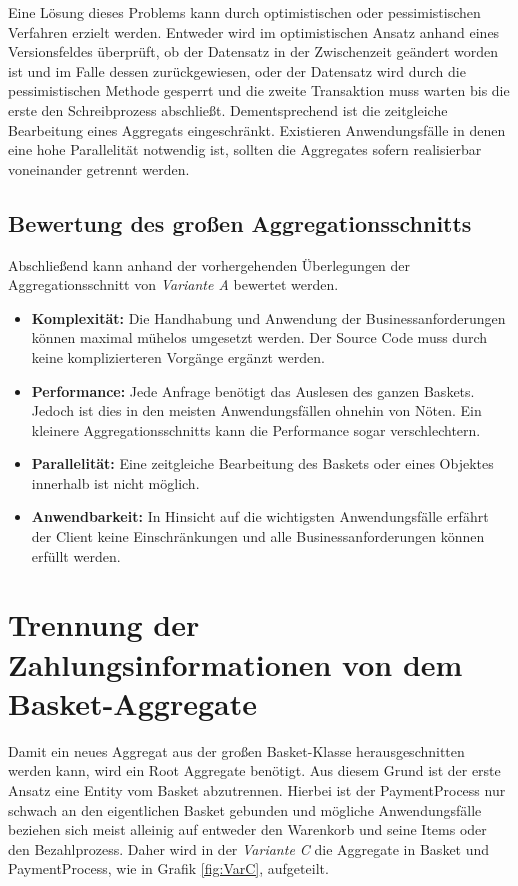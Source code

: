 Eine Lösung dieses Problems kann durch optimistischen oder pessimistischen Verfahren erzielt werden. Entweder wird im optimistischen Ansatz anhand eines Versionsfeldes überprüft, ob der Datensatz in der Zwischenzeit geändert worden ist und im Falle dessen zurückgewiesen, oder der Datensatz wird durch die pessimistischen Methode gesperrt und die zweite Transaktion muss warten bis die erste den Schreibprozess abschließt. Dementsprechend ist die zeitgleiche Bearbeitung eines Aggregats eingeschränkt. Existieren Anwendungsfälle in denen eine hohe Parallelität notwendig ist, sollten die Aggregates sofern realisierbar voneinander getrennt werden. 

\subsection{Bewertung des großen Aggregationsschnitts}

Abschließend kann anhand der vorhergehenden Überlegungen der Aggregationsschnitt von \emph{Variante A} bewertet werden.

\begin{itemize}[noitemsep,nolistsep,topsep=-2pt]
	\item \textbf{Komplexität: } {Die Handhabung und Anwendung der Businessanforderungen können maximal mühelos umgesetzt werden. Der Source Code muss durch keine komplizierteren Vorgänge ergänzt werden. }
	\item \textbf{Performance: } {Jede Anfrage benötigt das Auslesen des ganzen Baskets. Jedoch ist dies in den meisten Anwendungsfällen ohnehin von Nöten. Ein kleinere Aggregationsschnitts kann die Performance sogar verschlechtern. }
	\item \textbf{Parallelität: } {Eine zeitgleiche Bearbeitung des Baskets oder eines Objektes innerhalb ist nicht möglich.}
	\item \textbf{Anwendbarkeit: } {In Hinsicht auf die wichtigsten Anwendungsfälle erfährt der Client keine Einschränkungen und alle Businessanforderungen können erfüllt werden.}
\end{itemize}

\section{Trennung der Zahlungsinformationen von dem Basket-Aggregate}

Damit ein neues Aggregat aus der großen Basket-Klasse herausgeschnitten werden kann, wird ein Root Aggregate benötigt. Aus diesem Grund ist der erste Ansatz eine Entity vom Basket abzutrennen. Hierbei ist der PaymentProcess nur schwach an den eigentlichen Basket gebunden und mögliche Anwendungsfälle beziehen sich meist alleinig auf entweder den Warenkorb und seine Items oder den Bezahlprozess. Daher wird in der \emph{Variante C} die Aggregate in Basket und PaymentProcess, wie in Grafik \ref{fig:VarC}, aufgeteilt. 

